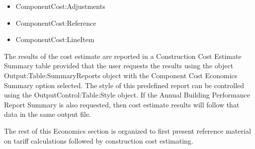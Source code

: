 \begin{itemize}
\item
  ComponentCost:Adjustments
\item
  ComponentCost:Reference
\item
  ComponentCost:LineItem
\end{itemize}

The results of the cost estimate are reported in a Construction Cost Estimate Summary table provided that the user requests the results using the object Output:Table:SummaryReports object with the Component Cost Economics Summary option selected. The style of this predefined report can be controlled using the OutputControl:Table:Style object. If the Annual Building Performance Report Summary is also requested, then cost estimate results will follow that data in the same output file.

The rest of this Economics section is organized to first present reference material on tariff calculations followed by construction cost estimating.
